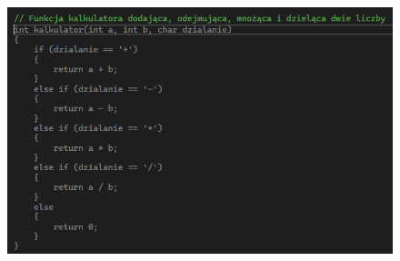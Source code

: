 \begin{figure}[H]
	\centering
	\includegraphics[width=1\linewidth]{images/CopilotComments}
	\caption{}
	\label{fig:copilotcomments}
\end{figure}
